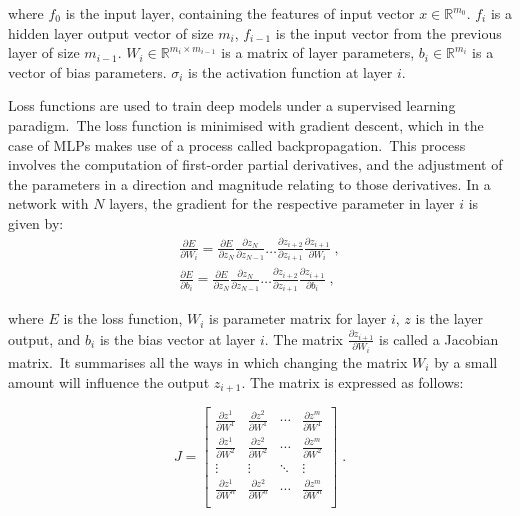 \noindent where $ f_0 $ is the input layer, containing the features of input vector $ x \in \mathbb{R}^{m_0} $. $ f_i $ is a hidden layer output vector of size $ m_i $, $ f_{i - 1} $ is the input vector from the previous layer of size $ m_{i-1} $. $ W_{i} \in \mathbb{R}^{m_i \times m_{i - 1}} $ is a matrix of layer parameters, $ b_{i} \in \mathbb{R}^{m_i} $ is a vector of bias parameters. $ \sigma_i $ is the activation function at layer $ i $.

\noindent Loss functions are used to train deep models under a supervised learning paradigm.\ The loss function is minimised with gradient descent, which in the case of MLPs makes use of a process called backpropagation.\ This process involves the computation of first-order partial derivatives, and the adjustment of the parameters in a direction and magnitude relating to those derivatives. In a network with $ N $ layers, the gradient for the respective parameter in layer $ i $ is given by:
\begin{subequations}
	\begin{gather}
		\frac{\partial E} {\partial W_i} = \frac{\partial E} {\partial z_N}\frac{\partial z_N} {\partial z_{N - 1}}  \dots \frac{\partial z_{i + 2}} {\partial z_{i + 1}}\frac{\partial z_{i + 1}} {\partial W_{i}} \; , \\
		\frac{\partial E} {\partial b_i} = \frac{\partial E} {\partial z_N}\frac{\partial z_N} {\partial z_{N - 1}}  \dots \frac{\partial z_{i + 2}} {\partial z_{i + 1}}\frac{\partial z_{i + 1}} {\partial b_{i}} \; ,
	\end{gather}
\end{subequations}

\noindent where $ E $ is the loss function, $ W_i $ is parameter matrix for layer $ i $, $ z $ is the layer output, and $ b_i $ is the bias vector at layer $ i $. The matrix $ \frac{\partial z_{i + 1}} {\partial W_i} $ is called a Jacobian matrix.\ It summarises all the ways in which changing the matrix $ W_i $ by a small amount will influence the output $ z_{i + 1} $. The matrix is expressed as follows: \par
\begin{equation}
	\renewcommand\arraystretch{2}
	J = \begin{bmatrix}
        		\frac{\partial z^1}{\partial W^1} & \frac{\partial z^2}{\partial W^1} & \cdots & \frac{\partial z^m}{\partial W^1} \\
           	\frac{\partial z^1}{\partial W^2} &\frac{\partial z^2}{\partial W^2} & \cdots & \frac{\partial z^m}{\partial W^2} \\
           	\vdots & \vdots & \ddots & \vdots \\
           	\frac{\partial z^1}{\partial W^n} & \frac{\partial z^2}{\partial W^n} & \cdots & \frac{\partial z^m}{\partial W^n} \\
        \end{bmatrix} \; .
\end{equation}

